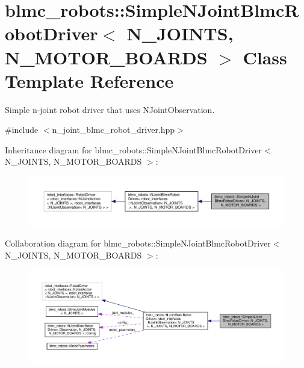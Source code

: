 \hypertarget{classblmc__robots_1_1SimpleNJointBlmcRobotDriver}{}\section{blmc\+\_\+robots\+:\+:Simple\+N\+Joint\+Blmc\+Robot\+Driver$<$ N\+\_\+\+J\+O\+I\+N\+TS, N\+\_\+\+M\+O\+T\+O\+R\+\_\+\+B\+O\+A\+R\+DS $>$ Class Template Reference}
\label{classblmc__robots_1_1SimpleNJointBlmcRobotDriver}


Simple n-\/joint robot driver that uses N\+Joint\+Observation.  




{\ttfamily \#include $<$n\+\_\+joint\+\_\+blmc\+\_\+robot\+\_\+driver.\+hpp$>$}



Inheritance diagram for blmc\+\_\+robots\+:\+:Simple\+N\+Joint\+Blmc\+Robot\+Driver$<$ N\+\_\+\+J\+O\+I\+N\+TS, N\+\_\+\+M\+O\+T\+O\+R\+\_\+\+B\+O\+A\+R\+DS $>$\+:
\nopagebreak
\begin{figure}[H]
\begin{center}
\leavevmode
\includegraphics[width=350pt]{classblmc__robots_1_1SimpleNJointBlmcRobotDriver__inherit__graph}
\end{center}
\end{figure}


Collaboration diagram for blmc\+\_\+robots\+:\+:Simple\+N\+Joint\+Blmc\+Robot\+Driver$<$ N\+\_\+\+J\+O\+I\+N\+TS, N\+\_\+\+M\+O\+T\+O\+R\+\_\+\+B\+O\+A\+R\+DS $>$\+:
\nopagebreak
\begin{figure}[H]
\begin{center}
\leavevmode
\includegraphics[width=350pt]{classblmc__robots_1_1SimpleNJointBlmcRobotDriver__coll__graph}
\end{center}
\end{figure}
